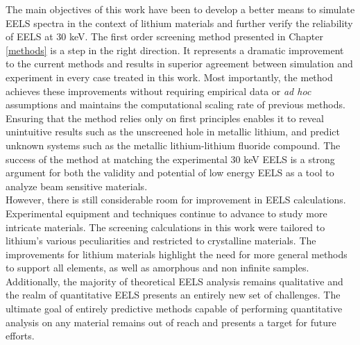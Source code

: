 
The main objectives of this work have been to develop a better means to simulate EELS spectra in the context of lithium materials and further verify the reliability of EELS at 30 keV.  The first order screening method presented in Chapter \ref{methods} is a step in the right direction.  It represents a dramatic improvement to the current methods and results in superior agreement between simulation and experiment in every case treated in this work.  Most importantly, the method achieves these improvements without requiring  empirical data or \textit{ad hoc} assumptions and maintains the computational scaling rate of previous methods. Ensuring that the method relies only on first principles enables it to reveal unintuitive results such as the unscreened hole in metallic lithium, and predict unknown systems such as the metallic lithium-lithium fluoride compound.  The success of the method at matching the experimental 30 keV EELS is a strong argument for both the validity and potential of low energy EELS as a tool to analyze beam sensitive materials.  \\

However, there is still considerable room for improvement in EELS calculations.  Experimental equipment and techniques continue to advance to study more intricate materials. The screening calculations in this work were tailored to lithium's various peculiarities and restricted to crystalline materials.  The improvements for lithium materials highlight the need for more general methods to support all elements, as well as amorphous and non infinite samples.  Additionally, the majority of theoretical EELS analysis remains qualitative and the realm of quantitative EELS presents an entirely new set of challenges. The ultimate goal of entirely predictive methods capable of performing quantitative analysis on any material remains out of reach and presents a target for future efforts. \\


 
